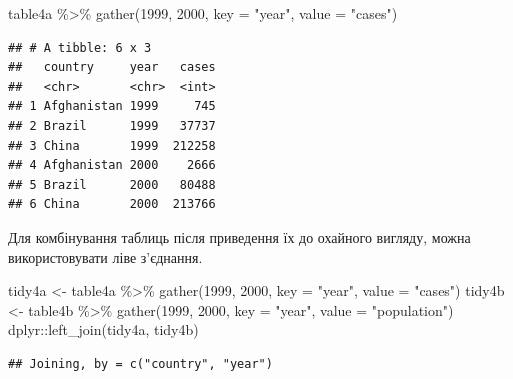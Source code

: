 \documentclass[
]{book}
\newenvironment{Shaded}{\begin{snugshade}}{\end{snugshade}}
\newcommand{\AttributeTok}[1]{\textcolor[rgb]{0.77,0.63,0.00}{#1}}
\newcommand{\FunctionTok}[1]{\textcolor[rgb]{0.00,0.00,0.00}{#1}}
\newcommand{\NormalTok}[1]{#1}
\newcommand{\OtherTok}[1]{\textcolor[rgb]{0.56,0.35,0.01}{#1}}
\newcommand{\SpecialCharTok}[1]{\textcolor[rgb]{0.00,0.00,0.00}{#1}}
\newcommand{\StringTok}[1]{\textcolor[rgb]{0.31,0.60,0.02}{#1}}
\begin{document}
\begin{Shaded}
\begin{Highlighting}[]
\NormalTok{table4a }\SpecialCharTok{\%\textgreater{}\%} 
  \FunctionTok{gather}\NormalTok{(}\StringTok{\textasciigrave{}}\AttributeTok{1999}\StringTok{\textasciigrave{}}\NormalTok{, }\StringTok{\textasciigrave{}}\AttributeTok{2000}\StringTok{\textasciigrave{}}\NormalTok{, }\AttributeTok{key =} \StringTok{"year"}\NormalTok{, }\AttributeTok{value =} \StringTok{"cases"}\NormalTok{)}
\end{Highlighting}
\end{Shaded}

\begin{verbatim}
## # A tibble: 6 x 3
##   country     year   cases
##   <chr>       <chr>  <int>
## 1 Afghanistan 1999     745
## 2 Brazil      1999   37737
## 3 China       1999  212258
## 4 Afghanistan 2000    2666
## 5 Brazil      2000   80488
## 6 China       2000  213766
\end{verbatim}

Для комбінування таблиць після приведення їх до охайного вигляду, можна використовувати ліве з'єднання.

\begin{Shaded}
\begin{Highlighting}[]
\NormalTok{tidy4a }\OtherTok{\textless{}{-}}\NormalTok{ table4a }\SpecialCharTok{\%\textgreater{}\%} 
  \FunctionTok{gather}\NormalTok{(}\StringTok{\textasciigrave{}}\AttributeTok{1999}\StringTok{\textasciigrave{}}\NormalTok{, }\StringTok{\textasciigrave{}}\AttributeTok{2000}\StringTok{\textasciigrave{}}\NormalTok{, }\AttributeTok{key =} \StringTok{"year"}\NormalTok{, }\AttributeTok{value =} \StringTok{"cases"}\NormalTok{)}
\NormalTok{tidy4b }\OtherTok{\textless{}{-}}\NormalTok{ table4b }\SpecialCharTok{\%\textgreater{}\%} 
  \FunctionTok{gather}\NormalTok{(}\StringTok{\textasciigrave{}}\AttributeTok{1999}\StringTok{\textasciigrave{}}\NormalTok{, }\StringTok{\textasciigrave{}}\AttributeTok{2000}\StringTok{\textasciigrave{}}\NormalTok{, }\AttributeTok{key =} \StringTok{"year"}\NormalTok{, }\AttributeTok{value =} \StringTok{"population"}\NormalTok{)}
\NormalTok{dplyr}\SpecialCharTok{::}\FunctionTok{left\_join}\NormalTok{(tidy4a, tidy4b)}
\end{Highlighting}
\end{Shaded}

\begin{verbatim}
## Joining, by = c("country", "year")
\end{verbatim}
\end{document}
